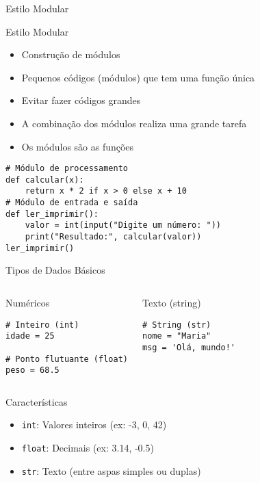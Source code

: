 \begin{frame}[fragile]{Estilo Modular}
\begin{block}{Estilo Modular}
\begin{itemize}
    \item Construção de módulos
    \item Pequenos códigos (módulos) que tem uma função única
    \item Evitar fazer códigos grandes
    \item A combinação dos módulos realiza uma grande tarefa
    \item Os módulos são as funções

\end{itemize}
\begin{verbatim}
# Módulo de processamento
def calcular(x):
    return x * 2 if x > 0 else x + 10
# Módulo de entrada e saída
def ler_imprimir():
    valor = int(input("Digite um número: "))
    print("Resultado:", calcular(valor))
ler_imprimir()
\end{verbatim}
\vspace{-0.3cm}

\end{block}


\end{frame}



\begin{frame}[fragile]{Tipos de Dados Básicos}
\begin{columns}[T]

\begin{block}{Numéricos}
\begin{verbatim}
# Inteiro (int)
idade = 25

# Ponto flutuante (float)
peso = 68.5
\end{verbatim}
\end{block}

\begin{block}{Texto (string)}
\begin{verbatim}
# String (str)
nome = "Maria"
msg = 'Olá, mundo!'
\end{verbatim}
\end{block}

\end{columns}

\begin{alertblock}{Características}
\begin{itemize}
    \item \texttt{int}: Valores inteiros (ex: -3, 0, 42)
    \item \texttt{float}: Decimais (ex: 3.14, -0.5)
    \item \texttt{str}: Texto (entre aspas simples ou duplas)
\end{itemize}
\end{alertblock}
\end{frame}

